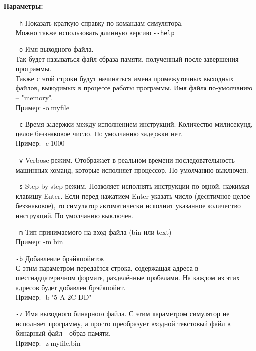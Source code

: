 {\bf Параметры:}
\begin{enumerate}
	\item[{\tt\large -h}]
	Показать краткую справку по командам симулятора.\\
	Можно также использовать длинную версию {\tt {-}-help}
	
	\item[{\tt\large -o}] 
	Имя выходного файла. \\ 
	Так будет называться файл образа памяти, полученный после завершения программы.\\
	Также с этой строки будут начинаться имена промежуточных выходных файлов, выводимых в процессе работы программы. Имя файла по-умолчанию -- "memory".\\
	Пример: -o myfile
	
	\item[{\tt\large -c}]
	Время задержки между исполнением инструкций. Количество милисекунд, целое беззнаковое число. По умолчанию задержки нет.\\
	Пример: -c 1000
	
	\item[{\tt\large -v}]
	Verbose режим. Отображает в реальном времени последовательность машинных команд, которые исполняет процессор. По умолчанию выключен.
	
	\item[{\tt\large -s}]
	Step-by-step режим. Позволяет исполнять инструкции по-одной, нажимая клавишу Enter. Если перед нажатием Enter указать число (десятичное целое беззнаковое), то симулятор автоматически исполнит указанное количество инструкций. По умолчанию выключен.
	
	\item[{\tt\large -m}]
	Тип принимаемого на вход файла (bin или text) \\
	Пример: -m bin
	
	\item[{\tt\large -b}]
	Добавление брэйкпойнтов \\
	С этим параметром передаётся строка, содержащая адреса в шестнадцатеричном формате, разделённые пробелами. На каждом из этих адресов будет добавлен брэйкпойнт. \\
	Пример: -b "5 A 2C DD"
	
	\item[{\tt\large -z}]
	Имя выходного бинарного файла.
	С этим параметром симулятор не исполняет программу, а просто преобразует входной текстовый файл в бинарный файл - образ памяти.\\
	Пример: -z myfile.bin
\end{enumerate}

